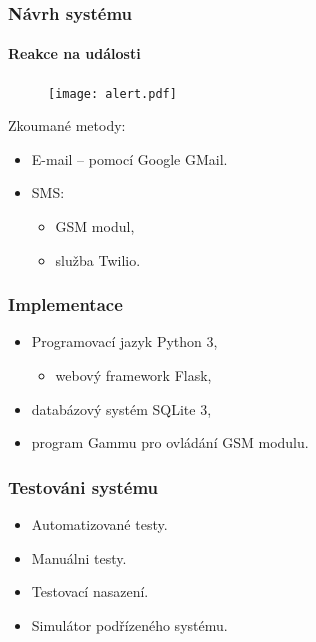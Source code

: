 \documentclass{beamer}
\begin{document}
  \begin{frame}
    \frametitle{Návrh systému}
    \framesubtitle{Reakce na události}

    \begin{figure}
        \texttt{[image: alert.pdf]}
    \end{figure}

    Zkoumané metody:

    \begin{itemize}
      \item E-mail -- pomocí Google GMail.
      \item SMS:
      \begin{itemize}
        \item GSM modul,
        \item služba Twilio. 
      \end{itemize}
    \end{itemize}


  \end{frame}

  \begin{frame}
    \frametitle{Implementace}

    \begin{itemize}
      \item Programovací jazyk Python 3,
      \begin{itemize}
        \item webový framework Flask,
      \end{itemize}
      \item databázový systém SQLite 3,
      \item program Gammu pro ovládání GSM modulu.
    \end{itemize}


  \end{frame}

  \begin{frame}
    \frametitle{Testováni systému}

    \begin{itemize}
      \item Automatizované testy. %
      \item Manuálni testy. %
      \item Testovací nasazení.
      \item Simulátor podřízeného systému.
    \end{itemize}

  \end{frame}
\end{document}
